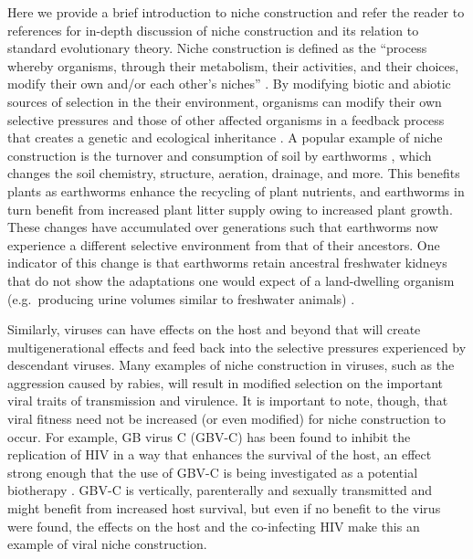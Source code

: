 \documentclass[review,draft,12pt]{elsarticle}
\begin{document}
Here we provide a brief introduction to niche construction and refer the
reader to references \citep{Odling-Smee:2003fk, Odling-Smee:2013zr} for
in-depth discussion of niche construction and its relation to standard
evolutionary theory. Niche construction is defined as the ``process
whereby organisms, through their metabolism, their activities, and their
choices, modify their own and/or each other's niches''
\citep{Laland:2006pd}. By modifying biotic and abiotic sources of
selection in the their environment, organisms can modify their own
selective pressures and those of other affected organisms in a feedback
process that creates a genetic and ecological inheritance \citep[Figure
2, and see Figure 2 of][]{Odling-Smee:2013zr}. A popular example of
niche construction is the turnover and consumption of soil by earthworms
\citep{Odling-Smee:2003fk}, which changes the soil chemistry, structure,
aeration, drainage, and more. This benefits plants as earthworms enhance
the recycling of plant nutrients, and earthworms in turn benefit from
increased plant litter supply owing to increased plant growth. These
changes have accumulated over generations such that earthworms now
experience a different selective environment from that of their
ancestors. One indicator of this change is that earthworms retain
ancestral freshwater kidneys that do not show the adaptations one would
expect of a land-dwelling organism (e.g.~producing urine volumes similar
to freshwater animals) \citep{Odling-Smee:2003fk}.

Similarly, viruses can have effects on the host and beyond that will
create multigenerational effects and feed back into the selective
pressures experienced by descendant viruses. Many examples of niche
construction in viruses, such as the aggression caused by rabies, will
result in modified selection on the important viral traits of
transmission and virulence. It is important to note, though, that viral
fitness need not be increased (or even modified) for niche construction
to occur. For example, GB virus C (GBV-C) has been found to inhibit the
replication of HIV in a way that enhances the survival of the host, an
effect strong enough that the use of GBV-C is being investigated as a
potential biotherapy \citep{Gretch:2012zt}. GBV-C is vertically,
parenterally and sexually transmitted and might benefit from increased
host survival, but even if no benefit to the virus were found, the
effects on the host and the co-infecting HIV make this an example of
viral niche construction.
\end{document}
